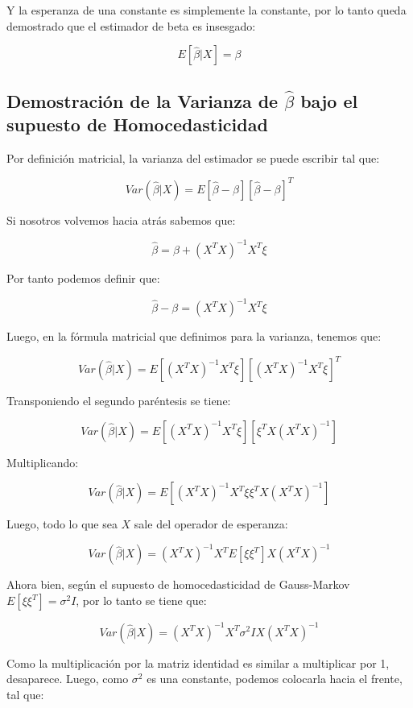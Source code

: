 \documentclass[
]{book}
\begin{document}
Y la esperanza de una constante es simplemente la constante, por lo tanto queda demostrado que el estimador de beta es insesgado:

\[
E[\hat{\beta}|X] = \beta
\]

\subsection{\texorpdfstring{Demostración de la Varianza de \(\hat{\beta}\) bajo el supuesto de Homocedasticidad}{Demostración de la Varianza de \textbackslash hat\{\textbackslash beta\} bajo el supuesto de Homocedasticidad}}\label{demostraciuxf3n-de-la-varianza-de-hatbeta-bajo-el-supuesto-de-homocedasticidad}

Por definición matricial, la varianza del estimador se puede escribir tal que:

\[
Var(\hat{\beta}|X) = E[\hat{\beta} - \beta][\hat{\beta} - \beta]^T
\]

Si nosotros volvemos hacia atrás sabemos que:

\[
\hat{\beta} = \beta + (X^TX)^{-1}X^T\xi
\]

Por tanto podemos definir que:

\[
\hat{\beta} - \beta = (X^TX)^{-1}X^T\xi
\]

Luego, en la fórmula matricial que definimos para la varianza, tenemos que:

\[
Var(\hat{\beta}|X) = E[(X^TX)^{-1}X^T\xi][(X^TX)^{-1}X^T\xi]^T
\]

Transponiendo el segundo paréntesis se tiene:

\[
Var(\hat{\beta}|X) = E[(X^TX)^{-1}X^T\xi][\xi^TX(X^TX)^{-1}]
\]

Multiplicando:

\[
Var(\hat{\beta}|X) = E[(X^TX)^{-1}X^T\xi\xi^TX(X^TX)^{-1}]
\]

Luego, todo lo que sea \(X\) sale del operador de esperanza:

\[
Var(\hat{\beta}|X) = (X^TX)^{-1}X^TE[\xi\xi^T]X(X^TX)^{-1}
\]

Ahora bien, según el supuesto de homocedasticidad de Gauss-Markov \(E[\xi\xi^T] = \sigma^2I\), por lo tanto se tiene que:

\[
Var(\hat{\beta}|X) = (X^TX)^{-1}X^T\sigma^2IX(X^TX)^{-1}
\]

Como la multiplicación por la matriz identidad es similar a multiplicar por 1, desaparece. Luego, como \(\sigma^2\) es una constante, podemos colocarla hacia el frente, tal que:
\end{document}
